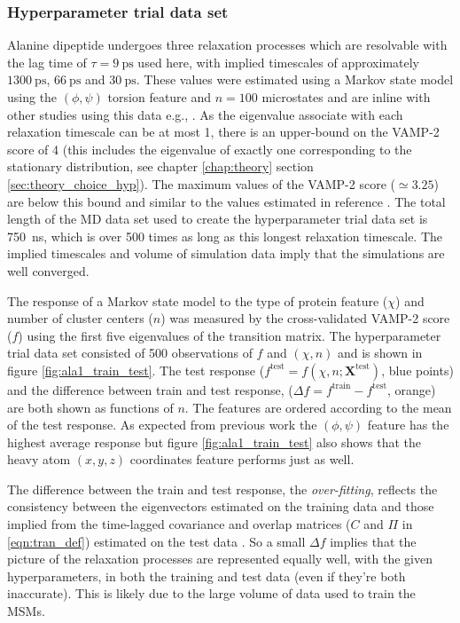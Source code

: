 \subsubsection{Hyperparameter trial data set}

Alanine dipeptide undergoes three relaxation processes which are resolvable with the lag time of $\tau=\SI{9}{\pico\second}$ used here, with implied timescales of approximately $\SI{1300}{\pico\second}$, $\SI{66}{\pico\second}$ and $\SI{30}{\pico\second}$. These values were estimated using a Markov state model using the $(\phi, \psi)$  torsion feature and $n=100$ microstates and are inline with other studies using this data e.g., \cite{varolgunesInterpretableEmbeddingsMolecular2020, mardtVAMPnetsDeepLearning2018}.  As the eigenvalue associate with each relaxation timescale can be at most \num{1}, there is an upper-bound on the VAMP-2 score of \num{4} (this includes the eigenvalue of exactly one corresponding to the stationary distribution, see chapter \ref{chap:theory} section \ref{sec:theory_choice_hyp}). The maximum values of the VAMP-2 score ($\simeq 3.25$) are below this bound and similar to the values estimated in reference \cite{mardtVAMPnetsDeepLearning2018}.  The total length of the MD data set used to create the hyperparameter trial data set is \SI{750}{\nano\second}, which is over \num{500} times as long as this longest relaxation timescale. The implied timescales and volume of simulation data imply that the simulations are well converged. 

The response of a Markov state model to the type of protein feature ($\chi$) and number of cluster centers ($n$) was measured by the cross-validated VAMP-2 score ($f$) using the first five eigenvalues of the transition matrix. The hyperparameter trial data set consisted of 500 observations of $f$ and $(\chi, n)$ and is shown in figure \ref{fig:ala1_train_test}. The test response ($f^{\mathrm{test}} = f\left(\chi, n; \mathbf{X}^{\mathrm{test}}\right)$, blue points) and the difference between train and test response, ($\Delta f = f^{\mathrm{train}} - f^{\mathrm{test}}$, orange) are both shown as functions of $n$. The features are ordered according to the  mean of the test response. As expected from previous work \cite{bolhuis2000reaction} the  $(\phi, \psi)$ feature has the highest average response but figure \ref{fig:ala1_train_test} also shows that the heavy atom $(x,y,z)$ coordinates feature performs just as well. 

The difference between the train and test response, the \emph{over-fitting}, reflects the consistency between the eigenvectors estimated on the training data and those implied from the time-lagged covariance and overlap matrices ($C$ and $\Pi$  in \ref{eqn:tran_def}) estimated  on the test data \cite{mcgibbonVariationalCrossvalidationSlow2015}. So a small $\Delta f$ implies that the picture of the relaxation processes are represented equally well, with the given hyperparameters, in both the training and test data (even if they're both inaccurate). This is likely due to the large volume of data used to train the MSMs. 



